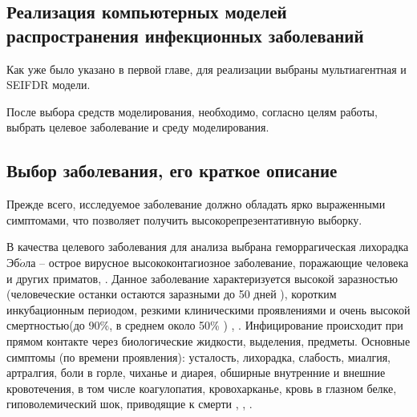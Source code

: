 \newpage
\parindent=1cm %
\begin{center}
		
		\section{Реализация компьютерных моделей распространения инфекционных заболеваний}
		
\end{center}

Как уже было указано  в первой главе, для реализации выбраны мультиагентная и SEIFDR модели.

После выбора средств моделирования, необходимо, согласно целям работы, выбрать целевое заболевание и среду моделирования.


\subsection{Выбор заболевания, его краткое описание}
Прежде всего, исследуемое заболевание должно обладать ярко выраженными симптомами, что позволяет получить высокорепрезентативную  выборку.


В качества целевого заболевания для анализа выбрана геморрагическая лихорадка Эб$\acute{o}$ла -- острое вирусное высококонтагиозное заболевание, поражающие человека и других приматов, . Данное заболевание характеризуется высокой заразностью (человеческие останки остаются заразными до 50 дней 
\cite{CDC:2014:1}), коротким инкубационным периодом, резкими клиническими проявлениями и очень высокой смертностью(до 90\%, в среднем около 50\% ) \cite{WHO:2018:1}, \cite[с. 444]{Sunit:2014}. %
Инфицирование происходит при прямом контакте через биологические жидкости, выделения, предметы. Основные симптомы (по времени проявления):  усталость, лихорадка, слабость, миалгия,  артралгия, боли в горле, чиханье и диарея,  обширные внутренние и внешние кровотечения, в том числе коагулопатия, кровохарканье, кровь в глазном белке, гиповолемический шок, приводящие к смерти \cite{ncbi:2011}, \cite{ovid:2016}, \cite{Springer:2015}  . 

